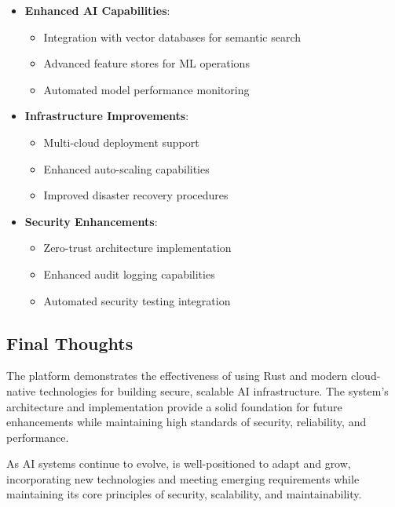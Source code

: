 \begin{itemize}
    \item \textbf{Enhanced AI Capabilities}:
    \begin{itemize}
        \item Integration with vector databases for semantic search
        \item Advanced feature stores for ML operations
        \item Automated model performance monitoring
    \end{itemize}

    \item \textbf{Infrastructure Improvements}:
    \begin{itemize}
        \item Multi-cloud deployment support
        \item Enhanced auto-scaling capabilities
        \item Improved disaster recovery procedures
    \end{itemize}

    \item \textbf{Security Enhancements}:
    \begin{itemize}
        \item Zero-trust architecture implementation
        \item Enhanced audit logging capabilities
        \item Automated security testing integration
    \end{itemize}
\end{itemize}

\subsection{Final Thoughts}

The \sysname{} platform demonstrates the effectiveness of using Rust and modern cloud-native technologies for building secure, scalable AI infrastructure. The system's architecture and implementation provide a solid foundation for future enhancements while maintaining high standards of security, reliability, and performance.

As AI systems continue to evolve, \sysname{} is well-positioned to adapt and grow, incorporating new technologies and meeting emerging requirements while maintaining its core principles of security, scalability, and maintainability.
